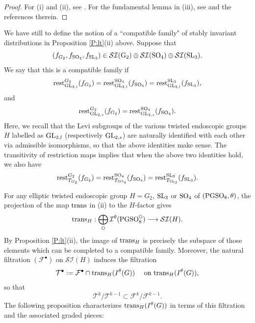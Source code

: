 \documentclass[11pt]{amsart}
\theoremstyle{plain}
\numberwithin{equation}{section}
\def\SL{{\rm SL}}
\def\PGSO{{\rm PGSO}}
\def\GL{{\rm GL}}
\def\SO{{\rm SO}}
\begin{document}
\begin{proof}
For (i) and (ii), see \cite[Prop. I.4.11, Pg. 96]{MW1}.  For the fundamental lemma in (iii), see \cite[\S I.6.4, Pg. 165]{MW1} and the references therein.
  \end{proof}
\vskip 5pt

We have still to define the notion of a ``compatible family" of stably invariant distributions in Proposition \ref{P:lt}(ii) above.
Suppose that 
\[   (f_{G_2}, f_{\SO_4}, f_{\SL_3})   \in   \mathcal{SI}({\rm G}_2) \oplus \mathcal{SI}(\SO_4) \oplus \mathcal{SI}(\SL_3).\]
 We say that this is a compatible family if  
\[ {\rm rest}^{G_2}_{\GL_{2,l}}  ( f_{G_2}) =    {\rm rest}^{\SO_4}_{\GL_{2,l}}  ( f_{\SO_4}) =    {\rm rest}^{\SL_3}_{\GL_{2,l}}  ( f_{\SL_3}), \]
and
\[  {\rm rest}^{G_2}_{\GL_{2,s}}  ( f_{G_2}) =    {\rm rest}^{\SO_4}_{\GL_{2,s}}  ( f_{\SO_4}).  \]
Here, we recall that the Levi subgroups of the various twisted endoscopic groups $H$ labelled as $\GL_{2,l}$ (respectively $\GL_{2,s}$) are naturally identified with each other via admissible isomorphisms, so that the above identities make sense.
The transitivity of restriction maps implies that when the above two identities hold, we also have 
\[   {\rm rest}^{G_2}_{T_{G_2}}  ( f_{G_2}) =    {\rm rest}^{\SO_4}_{T_{\SO_4}}  ( f_{\SO_4}) =    {\rm rest}^{\SL_3}_{T_{\SL_3}}  ( f_{\SL_3}).\]         
\vskip 5pt

 
 For any elliptic twisted endoscopic group $H = G_2$, $\SL_3$ or $\SO_4$ of $(\PGSO_8, \theta)$, the projection of  the map ${\rm trans}$ in (ii)  to the $H$-factor gives 
\[  {\rm trans}_H:  \bigoplus_{\mathbb{O}} \mathcal{I}^{\theta}(\PGSO^{\mathbb{O}}_8)  \longrightarrow  \mathcal{SI}(H). \]
By Proposition \ref{P:lt}(ii), the image of ${\rm trans}_H$ is precisely the subspace of those elements which can be completed to a compatible family. Moreover, the natural filtration $(\mathcal{F}^{\bullet})$ on $\mathcal{SI}(H)$ induces the filtration  
\[ \mathcal{T}^{\bullet}  :=  \mathcal{F}^{\bullet} \cap {\rm trans}_H(I^{\theta}(G)) \quad \text{ on ${\rm trans}_H(I^{\theta}(G))$,} \]
so that
\[ \mathcal{T}^k / \mathcal{T}^{k-1} \subset \mathcal{F}^k/ \mathcal{F}^{k-1}.\]
 The following proposition characterizes 
${\rm trans}_H(I^{\theta}(G))$ in terms of this filtration and the associated graded pieces:
\vskip 5pt
\end{document}
